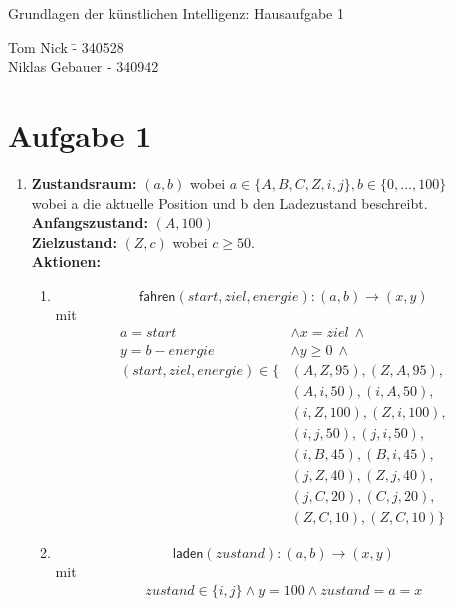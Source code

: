 \documentclass[a4paper,10pt]{article}
\begin{document}
\begin{center}
\Large{Grundlagen der künstlichen Intelligenz: Hausaufgabe 1} \\
\end{center}
\begin{tabbing}
Tom Nick \hspace{2cm}\= - 340528\\
Niklas Gebauer \> - 340942 \\
\end{tabbing}

\section*{Aufgabe 1}

\begin{enumerate}[~~a)]
	\item
	\textbf{Zustandsraum:} 
	$(a, b)$ wobei $ a \in \{A, B, C, Z, i, j\}, b \in \{0,\dots,100\} $ \\
	wobei a die aktuelle Position und b den Ladezustand beschreibt. \\
	\textbf{Anfangszustand:}
	$(A,100)$ \\
	\textbf{Zielzustand:}
	$(Z,c)$ wobei $c \ge 50$. \\
	\textbf{Aktionen:}
	\begin{enumerate}[~~1.]
	\item $$\textsf{fahren}(start, ziel, energie): (a, b) \rightarrow (x, y)$$ 
	mit 
	\begin{align*}
		a = start &\land x = ziel ~\land \\
		y = b - energie  &\land y \ge 0 ~\land\\
		(start, ziel, energie)  \in \{&(A, Z, 95), (Z, A, 95),\\
		&(A,i,50), (i,A,50),\\
		&(i,Z,100), (Z,i,100),\\
		&(i,j,50), (j,i,50),\\
		&(i,B,45), (B,i,45),\\
		&(j,Z,40), (Z,j,40),\\
		&(j,C,20), (C,j,20),\\
		&(Z,C,10), (Z,C,10)\}
	\end{align*}
	\item $$\textsf{laden}(zustand): (a, b) \rightarrow (x, y)$$ 
	mit 
	\begin{align*}
		zustand \in \{ i, j \} \land y = 100 \land zustand = a = x
	\end{align*}
	\end{enumerate}

\end{enumerate}
\end{document}
